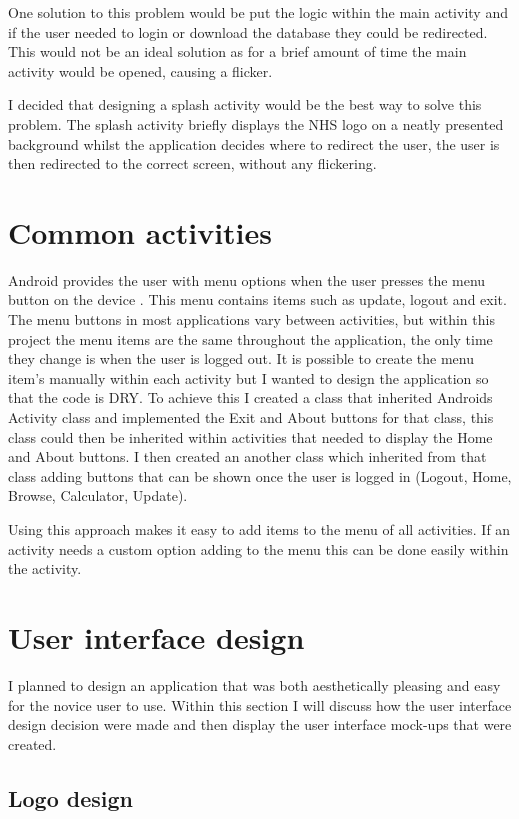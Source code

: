 One solution to this problem would be put the logic within the main activity and if the user needed to login or download the database they could be redirected. This would not be an ideal solution as for a brief amount of time the main activity would be opened, causing a flicker.

I decided that designing a splash activity would be the best way to solve this problem. The splash activity briefly displays the NHS \cite{nhs_website} logo on a neatly presented background whilst the application decides where to redirect the user, the user is then redirected to the correct screen, without any flickering.

\section{Common activities}
Android provides the user with menu options when the user presses the menu button on the device \cite{android}. This menu contains items such as update, logout and exit. The menu buttons in most applications vary between activities, but within this project the menu items are the same throughout the application, the only time they change is when the user is logged out. 
It is possible to create the menu item’s manually within each activity but I wanted to design the application so that the code is DRY. To achieve this I created a class that inherited Androids Activity class and implemented the Exit and About buttons for that class, this class could then be inherited within activities that needed to display the Home and About buttons. I then created an another class which inherited from that class adding buttons that can be shown once the user is logged in (Logout, Home, Browse, Calculator, Update). 

Using this approach makes it easy to add items to the menu of all activities. If an activity needs a custom option adding to the menu this can be done easily within the activity.

\section{User interface design}

I planned to design an application that was both aesthetically pleasing and easy for the novice user to use. Within this section I will discuss how the user interface design decision were made and then display the user interface mock-ups that were created.

\subsection{Logo design}

